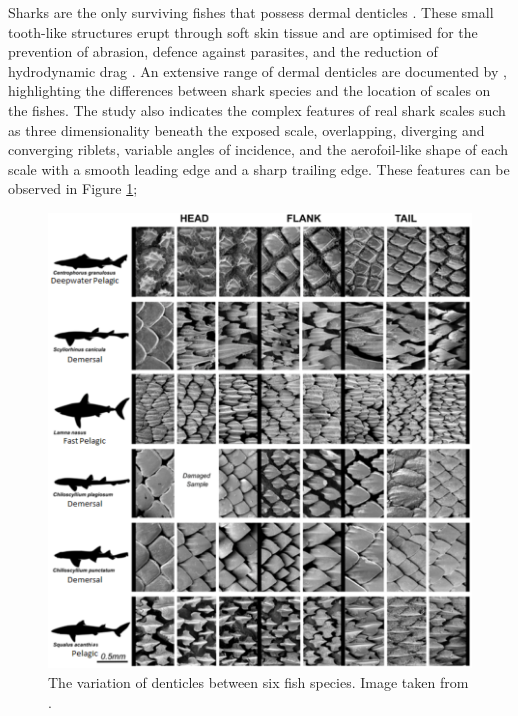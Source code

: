 \documentclass[12pt,oneside,a4paper]{article}
\begin{document}
Sharks are the only surviving fishes that possess dermal denticles \citep{fletcher2014phd}. These small tooth-like structures erupt through soft skin tissue and are optimised for the prevention of abrasion, defence against parasites, and the reduction of hydrodynamic drag \citep{fletcher2014phd}. An extensive range of dermal denticles are documented by \cite{reif1985}, highlighting the differences between shark species and the location of scales on the fishes. The study also indicates the complex features of real shark scales such as three dimensionality beneath the exposed scale, overlapping, diverging and converging riblets, variable angles of incidence, and the aerofoil-like shape of each scale with a smooth leading edge and a sharp trailing edge. These features can be observed in Figure \ref{figure:literatureReview:scaleVariabilityFletcher};
\begin{figure}[!b]
\centering
\includegraphics[width=14cm]{images/litReview/scaleVariabilityFletcher.png}
\caption{The variation of denticles between six fish species. Image taken from \citep{fletcher2014phd}.}
\label{figure:literatureReview:scaleVariabilityFletcher}
\end{figure}
\end{document}
